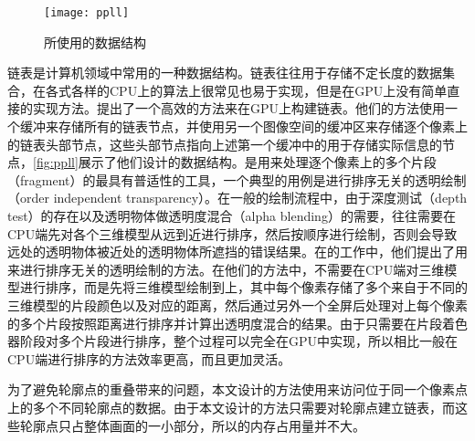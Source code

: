 \begin{figure}[tbh]
    \centering
    \texttt{[image: ppll]}
    \caption{\label{fig:ppll}
    \ppll{}所使用的数据结构}
\end{figure}

链表是计算机领域中常用的一种数据结构。链表往往用于存储不定长度的数据集合，在各式各样的CPU上的算法上很常见也易于实现，但是在GPU上没有简单直接的实现方法。\citeauthor{yang2010real}提出了一个高效的方法\cite{yang2010real}来在GPU上构建链表。他们的方法使用一个缓冲来存储所有的链表节点，并使用另一个图像空间的缓冲区来存储逐个像素上的链表头部节点，这些头部节点指向上述第一个缓冲中的用于存储实际信息的节点，\autoref{fig:ppll}展示了他们设计的数据结构。\ppll{}是用来处理逐个像素上的多个片段（fragment）的最具有普适性的工具，一个典型的用例是进行排序无关的透明绘制（order independent transparency）。在一般的绘制流程中，由于深度测试（depth test）的存在以及透明物体做透明度混合（alpha blending）的需要，往往需要在CPU端先对各个三维模型从远到近进行排序，然后按顺序进行绘制，否则会导致远处的透明物体被近处的透明物体所遮挡的错误结果。在\citeauthor{barta2011order}的工作中\cite{barta2011order}，他们提出了用\ppll{}来进行排序无关的透明绘制的方法。在他们的方法中，不需要在CPU端对三维模型进行排序，而是先将三维模型绘制到\ppll{}上，其中每个像素存储了多个来自于不同的三维模型的片段颜色以及对应的距离，然后通过另外一个全屏后处理对\ppll{}上每个像素的多个片段按照距离进行排序并计算出透明度混合的结果。由于只需要在片段着色器阶段对多个片段进行排序，整个过程可以完全在GPU中实现，所以相比一般在CPU端进行排序的方法效率更高，而且更加灵活。

为了避免轮廓点的重叠带来的问题，本文设计的方法使用\ppll{}来访问位于同一个像素点上的多个不同轮廓点的数据。由于本文设计的方法只需要对轮廓点建立链表，而这些轮廓点只占整体画面的一小部分，所以\ppll{}的内存占用量并不大。